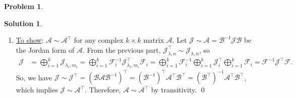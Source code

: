 \documentclass{article}
\theoremstyle{definition}
\newtheorem*{prob*}{Problem}
\newtheorem*{sln*}{Solution}
\newcommand{\F}{\mathcal{F}}
\newcommand{\A}{\mathcal{A}}
\newcommand{\B}{\mathcal{B}}
\newcommand{\jor}{\mathcal{J}}
\begin{document}
\begin{prob*}
\begin{sln*}
\begin{enumerate}
		 
		\item \underline{To show}: $\A \sim \A^\top$ for any complex $k\times k$ matrix $\A$. Let $\jor \sim \A = \B^{-1} \jor \B $ be the Jordan form of $\A$. From the previous part, $\jor^\top_{\lambda,n} \sim \jor_{\lambda,n}$, so
		\begin{align*}
		\jor &= \bigoplus^{k}_{i=1}\jor_{\lambda_i,m_i} = \bigoplus^k_{i=1} \F_i^{-1} \jor^\top_{\lambda_i,m_i} \F_i 
		= \bigoplus^k_{i=1} \F_i^{-1}\bigoplus^k_{i=1} \jor^\top_{i} \bigoplus^k_{i=1} \F_i 
		= \F^{-1}\jor^\top \F.
		\end{align*}
		So, we have $\jor \sim \jor^\top = (\B\A\B^{-1})^\top = (\B^{-1})^\top \A^\top \B^\top = (\B^\top)^{-1} \A^\top \B^\top$, which implies $\jor \sim \A^\top$. Therefore, $\A \sim \A^\top$ by transitivity.  \qed
		
		
		 

		\end{enumerate}
	\end{sln*}
	
	
\end{prob*}




\newpage
\end{document}
